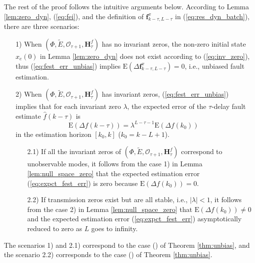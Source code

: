 \documentclass[twocolumn]{autart}
\begin{document}
The rest of the proof follows the intuitive arguments below.
According to Lemma \ref{lem:zero_dyn}, (\ref{eq:fei}), and the definition of $\mathbf{f}_{k-\tau,L-\tau}^x$ in (\ref{eq:res_dyn_batch}), there are three scenarios:
\begin{enumerate}
	\item[1)] When $( \Phi, \tilde E, \mathcal{O}_{\tau+1}, \mathbf{H}_{\tau}^f )$ has no invariant zeros, the non-zero initial state $x_e(0)$ in Lemma \ref{lem:zero_dyn} does not exist according to (\ref{eq:inv_zero}), thus (\ref{eq:fest_err_unbias}) implies $\mathrm{E} \left( {\Delta {\mathbf{{{f}}}}_{k-\tau,L-\tau}^x} \right)= 0$, i.e., unbiased fault estimation.
	\item[2)] When $( \Phi, \tilde E, \mathcal{O}_{\tau+1}, \mathbf{H}_{\tau}^f )$ has invariant zeros, (\ref{eq:fest_err_unbias}) implies that for each invariant zero $\lambda$, the expected error of the $\tau$-delay fault estimate $\hat f(k-\tau)$ is 
	\begin{equation}\label{eq:expct_fest_err}
	\text{E} \left(\Delta f(k-\tau)\right) = \lambda^{L-\tau-1} \text{E} \left(\Delta f(k_0)\right)
	\end{equation}
	in the estimation horizon $[k_0, k]$ ($k_0 = k-L+1$).
		\begin{enumerate}
			\item[2.1)] If all the invariant zeros of $( \Phi, \tilde E, \mathcal{O}_{\tau+1}, \mathbf{H}_{\tau}^f )$ correspond to unobservable modes, it follows from the case 1) in Lemma \ref{lem:null_space_zero} that the expected estimation error (\ref{eq:expct_fest_err}) is zero because $\text{E} \left(\Delta f(k_0)\right) = 0$.
			\item[2.2)] If transmission zeros exist but are all stable, i.e., $|\lambda| < 1$, it follows from the case 2) in Lemma \ref{lem:null_space_zero} that $\text{E} \left(\Delta f(k_0)\right) \ne 0$ and the expected estimation error (\ref{eq:expct_fest_err}) asymptotically reduced to zero as $L$ goes to infinity.
		\end{enumerate}
\end{enumerate}
The scenarios 1) and 2.1) correspond to the case () of Theorem \ref{thm:unbias}, and the scenario 2.2) corresponds to the case () of Theorem \ref{thm:unbias}.
\end{document}

